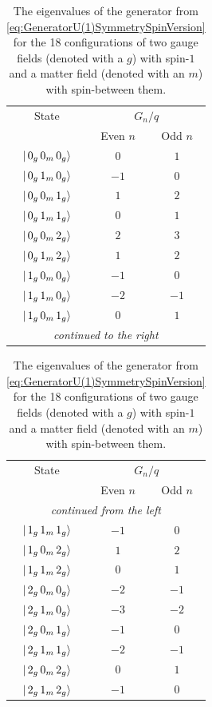 \documentclass[../main.tex]{subfiles} %
\begin{document}
\begin{table}[t]
    \centering
    \begin{tabular}{|c|c|c|}
        \hline
        State & \multicolumn{2}{c|}{$G_n / q$} \\
         & Even $n$ & Odd $n$ \\ \hline
        $\ket{\, 0_g\, 0_m\, 0_g}$ & $0$ & $1$ \\ \hline
        $\ket{\, 0_g\, 1_m\, 0_g}$ & $-1$ & $0$ \\ \hline
        $\ket{\, 0_g\, 0_m\, 1_g}$ & $1$ & $2$ \\ \hline
        $\ket{\, 0_g\, 1_m\, 1_g}$ & $0$ & $1$ \\ \hline
        $\ket{\, 0_g\, 0_m\, 2_g}$ & $2$ & $3$ \\ \hline
        $\ket{\, 0_g\, 1_m\, 2_g}$ & $1$ & $2$ \\ \hline
        $\ket{\, 1_g\, 0_m\, 0_g}$ & $-1$ & $0$ \\ \hline
        $\ket{\, 1_g\, 1_m\, 0_g}$ & $-2$ & $-1$ \\ \hline
        $\ket{\, 1_g\, 0_m\, 1_g}$ & $0$ & $1$ \\ \hline
        \multicolumn{3}{|c|}{\textsl{continued to the right}} \\ \hline
    \end{tabular}
    \hspace{.3em}
    \begin{tabular}{|c|c|c|}
        \hline
        State & \multicolumn{2}{c|}{$G_n / q$} \\
         & Even $n$ & Odd $n$ \\ \hline
        \multicolumn{3}{|c|}{\textsl{continued from the left}} \\ \hline
        $\ket{\, 1_g\, 1_m\, 1_g}$ & $-1$ & $0$ \\ \hline
        $\ket{\, 1_g\, 0_m\, 2_g}$ & $1$ & $2$ \\ \hline
        $\ket{\, 1_g\, 1_m\, 2_g}$ & $0$ & $1$ \\ \hline
        $\ket{\, 2_g\, 0_m\, 0_g}$ & $-2$ & $-1$ \\ \hline
        $\ket{\, 2_g\, 1_m\, 0_g}$ & $-3$ & $-2$ \\ \hline
        $\ket{\, 2_g\, 0_m\, 1_g}$ & $-1$ & $0$ \\ \hline
        $\ket{\, 2_g\, 1_m\, 1_g}$ & $-2$ & $-1$ \\ \hline
        $\ket{\, 2_g\, 0_m\, 2_g}$ & $0$ & $1$ \\ \hline
        $\ket{\, 2_g\, 1_m\, 2_g}$ & $-1$ & $0$ \\ \hline
    \end{tabular}
    \caption{The eigenvalues of the generator from \cref{eq:GeneratorU(1)SymmetrySpinVersion} for the 18 configurations of two gauge fields (denoted with a $g$) with spin-$1$ and a matter field (denoted with an $m$) with spin-\half between them.}
    \label{tab:EigenvaluesOfGenerator}
\end{table}
\end{document}
